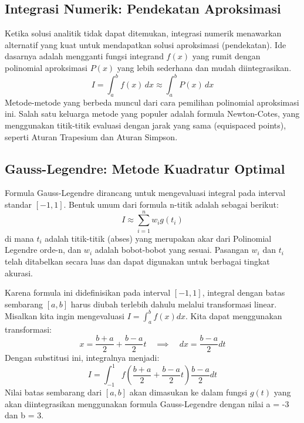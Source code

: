 \documentclass[conference]{IEEEtran}
\begin{document}
\subsection{Integrasi Numerik: Pendekatan Aproksimasi}
Ketika solusi analitik tidak dapat ditemukan, integrasi numerik menawarkan alternatif yang kuat untuk mendapatkan solusi aproksimasi (pendekatan). Ide dasarnya adalah mengganti fungsi integrand $f(x)$ yang rumit dengan polinomial aproksimasi $P(x)$ yang lebih sederhana dan mudah diintegrasikan.
\begin{equation}
    I = \int_{a}^{b} f(x) \,dx \approx \int_{a}^{b} P(x) \,dx
\end{equation}
Metode-metode yang berbeda muncul dari cara pemilihan polinomial aproksimasi ini. Salah satu keluarga metode yang populer adalah formula Newton-Cotes, yang menggunakan titik-titik evaluasi dengan jarak yang sama (equispaced points), seperti Aturan Trapesium dan Aturan Simpson.

\subsection{Gauss-Legendre: Metode Kuadratur Optimal}
Formula Gauss-Legendre dirancang untuk mengevaluasi integral pada interval standar $[-1, 1]$. Bentuk umum dari formula n-titik adalah sebagai berikut:
\begin{equation}
    I \approx \sum_{i=1}^{n} w_i g(t_i)
    \label{eq:gauss_legendre}
\end{equation}
di mana $t_i$ adalah titik-titik (abses) yang merupakan akar dari Polinomial Legendre orde-n, dan $w_i$ adalah bobot-bobot yang sesuai. Pasangan $w_i$ dan $t_i$ telah ditabelkan secara luas dan dapat digunakan untuk berbagai tingkat akurasi.

Karena formula ini didefinisikan pada interval $[-1, 1]$, integral dengan batas sembarang $[a, b]$ harus diubah terlebih dahulu melalui transformasi linear. Misalkan kita ingin mengevaluasi $I = \int_{a}^{b} f(x) dx$. Kita dapat menggunakan transformasi:
\begin{equation}
    x = \frac{b+a}{2} + \frac{b-a}{2}t \quad \implies \quad dx = \frac{b-a}{2}dt
\end{equation}
Dengan substitusi ini, integralnya menjadi:
\begin{equation}
    I = \int_{-1}^{1} f\left(\frac{b+a}{2} + \frac{b-a}{2}t\right) \frac{b-a}{2} dt
\end{equation}
Nilai batas sembarang dari $[a, b]$ akan dimasukan ke dalam fungsi $g(t)$ yang akan diintegrasikan menggunakan formula Gauss-Legendre dengan nilai a = -3 dan b = 3.
\end{document}
